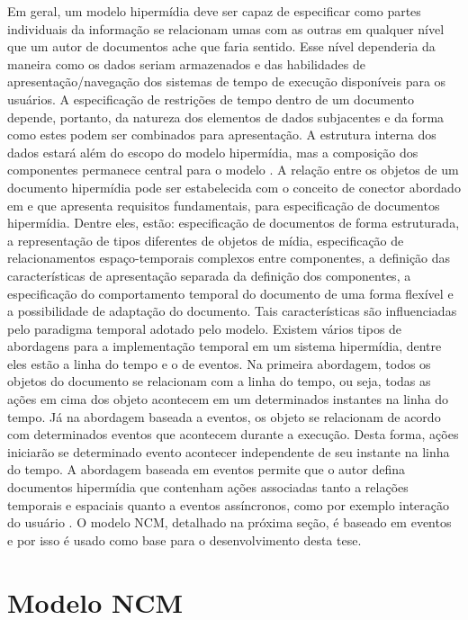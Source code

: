 Em geral, um modelo hipermídia deve ser capaz de especificar como partes individuais da informação se relacionam umas com as outras em qualquer nível que um autor de documentos ache que faria sentido. Esse nível dependeria da maneira como os dados seriam armazenados e das habilidades de apresentação/navegação dos sistemas de tempo de execução disponíveis para os usuários. A especificação de restrições de tempo dentro de um documento depende, portanto, da natureza dos elementos de dados subjacentes e da forma como estes podem ser combinados para apresentação. A estrutura interna dos dados estará além do escopo do modelo hipermídia, mas a composição dos componentes permanece central para o modelo \cite{Soares:2005qy}. A relação entre os objetos de um documento hipermídia pode ser estabelecida com o conceito de conector abordado em \cite{Muchaluat-Saade:2002aa,Muchaluat-Saade:2003aa} e que apresenta requisitos fundamentais, para especificação de documentos hipermídia. Dentre eles, estão: especificação de documentos de forma estruturada, a representação de tipos diferentes de objetos de mídia, especificação de relacionamentos espaço-temporais complexos entre componentes, a definição das características de apresentação separada da definição dos componentes, a especificação do comportamento temporal do documento de uma forma flexível e a possibilidade de adaptação do documento. Tais características são influenciadas pelo paradigma temporal adotado pelo modelo. Existem vários tipos de abordagens para a implementação temporal em um sistema hipermídia, dentre eles estão a linha do tempo e o de eventos. Na primeira abordagem, todos os objetos do documento se relacionam com a linha do tempo, ou seja, todas as ações em cima dos objeto acontecem em um determinados instantes na linha do tempo. Já na abordagem baseada a eventos, os objeto se relacionam de acordo com determinados eventos que acontecem durante a execução. Desta forma, ações iniciarão se determinado evento acontecer independente de seu instante na linha do tempo. A abordagem baseada em eventos permite que o autor defina documentos hipermídia que contenham ações associadas tanto a relações temporais e espaciais quanto a eventos assíncronos, como por exemplo interação do usuário \cite{allen1983maintaining}. O modelo NCM, detalhado na próxima seção, é baseado em eventos e por isso é usado como base para o desenvolvimento desta tese.

\section{Modelo NCM}
\label{sec:modeloNCM}


